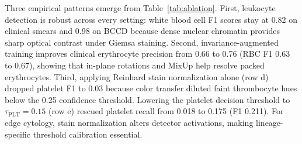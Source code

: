 \documentclass[10pt,conference]{IEEEtran}
\begin{document}
\begin{table}[!t]
\centering
\caption{Empirical ablation of training recipes and inference adaptation on in-domain (BCCD) and out-of-distribution (Clinical 72) datasets. Metrics report detection mAP@0.5 and class-specific F1-scores.}
\label{tab:ablation}
\setlength{\tabcolsep}{5pt}
\renewcommand{\arraystretch}{1.15}
\end{table}

Three empirical patterns emerge from Table~\ref{tab:ablation}. First, leukocyte detection is robust across every setting: white blood cell F1 scores stay at 0.82 on clinical smears and 0.98 on BCCD because dense nuclear chromatin provides sharp optical contrast under Giemsa staining. Second, invariance-augmented training improves clinical erythrocyte precision from 0.66 to 0.76 (RBC F1 0.63 to 0.67), showing that in-plane rotations and MixUp help resolve packed erythrocytes. Third, applying Reinhard stain normalization alone (row d) dropped platelet F1 to 0.03 because color transfer diluted faint thrombocyte hues below the 0.25 confidence threshold. Lowering the platelet decision threshold to $\tau_{\text{PLT}} = 0.15$ (row e) rescued platelet recall from 0.018 to 0.175 (F1 0.211). For edge cytology, stain normalization alters detector activations, making lineage-specific threshold calibration essential.
\end{document}
